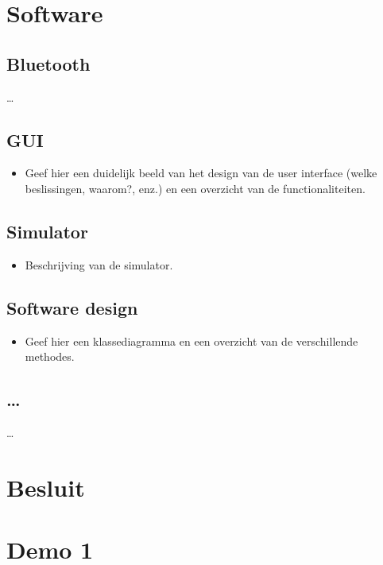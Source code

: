 \documentclass[tt1]{penoverslag}
\begin{document}
\section{Software}
\lipsum[5]

\subsection{Bluetooth}
\ldots

\subsection{GUI}
\begin{itemize}
\item Geef hier een duidelijk beeld van het design van de user interface (welke beslissingen, waarom?, enz.) en een overzicht van de functionaliteiten.
\end{itemize}

\subsection{Simulator}
\begin{itemize}
\item Beschrijving van de simulator.
\end{itemize}

\subsection{Software design}
\begin{itemize}
\item Geef hier een klassediagramma en een overzicht van de verschillende methodes.
\end{itemize}

\subsection{\ldots}
\ldots


\section{Besluit}
\lipsum[6-7]



\newpage
\makeappendix

\section{Demo 1}
\end{document}
